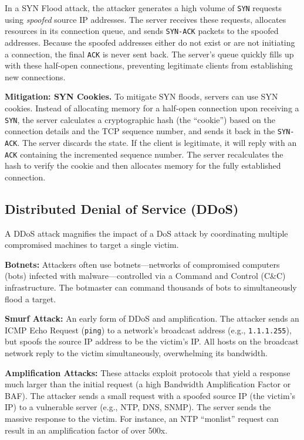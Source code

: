 In a SYN Flood attack, the attacker generates a high volume of \texttt{SYN} requests using \textit{spoofed} source IP addresses. The server receives these requests, allocates resources in its connection queue, and sends \texttt{SYN-ACK} packets to the spoofed addresses. Because the spoofed addresses either do not exist or are not initiating a connection, the final \texttt{ACK} is never sent back. The server's queue quickly fills up with these half-open connections, preventing legitimate clients from establishing new connections.

\textbf{Mitigation: SYN Cookies.} To mitigate SYN floods, servers can use SYN cookies. Instead of allocating memory for a half-open connection upon receiving a \texttt{SYN}, the server calculates a cryptographic hash (the ``cookie'') based on the connection details and the TCP sequence number, and sends it back in the \texttt{SYN-ACK}. The server discards the state. If the client is legitimate, it will reply with an \texttt{ACK} containing the incremented sequence number. The server recalculates the hash to verify the cookie and then allocates memory for the fully established connection.

\subsection{Distributed Denial of Service (DDoS)}

A DDoS attack magnifies the impact of a DoS attack by coordinating multiple compromised machines to target a single victim.

\textbf{Botnets:} Attackers often use botnets---networks of compromised computers (bots) infected with malware---controlled via a Command and Control (C\&C) infrastructure. The botmaster can command thousands of bots to simultaneously flood a target.

\textbf{Smurf Attack:} An early form of DDoS and amplification. The attacker sends an ICMP Echo Request (\texttt{ping}) to a network's broadcast address (e.g., \texttt{1.1.1.255}), but spoofs the source IP address to be the victim's IP. All hosts on the broadcast network reply to the victim simultaneously, overwhelming its bandwidth.

\textbf{Amplification Attacks:} These attacks exploit protocols that yield a response much larger than the initial request (a high Bandwidth Amplification Factor or BAF). The attacker sends a small request with a spoofed source IP (the victim's IP) to a vulnerable server (e.g., NTP, DNS, SNMP). The server sends the massive response to the victim. For instance, an NTP ``monlist'' request can result in an amplification factor of over 500x.

